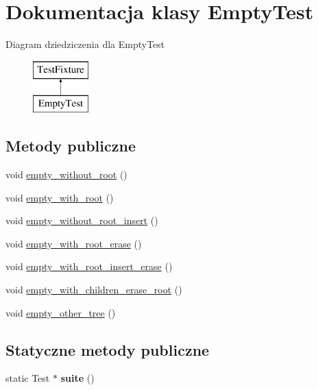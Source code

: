 \hypertarget{class_empty_test}{}\section{Dokumentacja klasy Empty\+Test}
\label{class_empty_test}
Diagram dziedziczenia dla Empty\+Test\begin{figure}[H]
\begin{center}
\leavevmode
\includegraphics[height=2.000000cm]{class_empty_test}
\end{center}
\end{figure}
\subsection*{Metody publiczne}
\begin{DoxyCompactItemize}
\item 
void \hyperlink{class_empty_test_a27a72313c820dae24223b04c4f1cc376}{empty\+\_\+without\+\_\+root} ()
\item 
void \hyperlink{class_empty_test_abd96646c19026d62a5317285cbf5f49b}{empty\+\_\+with\+\_\+root} ()
\item 
void \hyperlink{class_empty_test_ad17133b184176d9d8b0511168d13ca6b}{empty\+\_\+without\+\_\+root\+\_\+insert} ()
\item 
void \hyperlink{class_empty_test_a5112f76f08ce5f0b52016ea8a8afff4b}{empty\+\_\+with\+\_\+root\+\_\+erase} ()
\item 
void \hyperlink{class_empty_test_a6a62d370484dd86a856514d168d176d4}{empty\+\_\+with\+\_\+root\+\_\+insert\+\_\+erase} ()
\item 
void \hyperlink{class_empty_test_a07de70993f853c66e95865432fc4ce7f}{empty\+\_\+with\+\_\+children\+\_\+erase\+\_\+root} ()
\item 
void \hyperlink{class_empty_test_a6373058c0b937d07bb07b8482f663315}{empty\+\_\+other\+\_\+tree} ()
\end{DoxyCompactItemize}
\subsection*{Statyczne metody publiczne}
\begin{DoxyCompactItemize}
\item 
\mbox{\label{class_empty_test_a48e2fa8b65dab0443ba90e57289a58cf}} 
static Test $\ast$ {\bfseries suite} ()
\end{DoxyCompactItemize}


